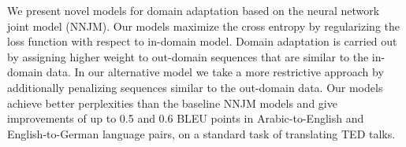 We present novel models for domain adaptation based on the neural network joint model (NNJM). Our models maximize the cross entropy by regularizing the loss function with respect to in-domain model. Domain adaptation is carried out by assigning higher weight to out-domain sequences that are similar to the in-domain data. In our alternative model we take a more restrictive approach by additionally penalizing sequences similar to the out-domain data. Our models achieve better perplexities than the baseline NNJM models and give improvements of up to 0.5 and 0.6 BLEU points in Arabic-to-English and English-to-German language pairs, on a standard task of translating TED talks.
